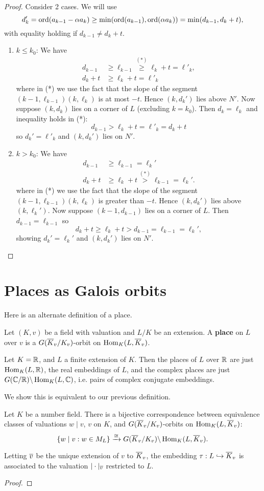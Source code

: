 \begin{proof}
Consider 2 cases. We will use 
\[
d_k'=\operatorname{ord}(a_{k-1}-\alpha a_{k})\ge 
\min(\operatorname{ord}(a_{k-1}),\operatorname{ord}(\alpha a_{k}))=\min(d_{k-1},d_k+t),
\]
with equality holding if $d_{k-1}\ne d_k+t$.
\begin{enumerate}
\item $k\le k_0$: We have
\begin{align*}
d_{k-1}& \ge \ell_{k-1}\stackrel{(*)}{\ge} \ell_k+t=\ell'_k,\\
d_k+t& \ge \ell_k+t= \ell'_k
\end{align*}
where in (*) we use the fact that the slope of the segment $(k-1,\ell_{k-1})(k,\ell_k)$ is at most $-t$. 
Hence $(k,d_k')$ lies above $N'$. Now suppose $(k,d_k)$ lies on a corner of $L$ (excluding $k=k_0$). Then $d_k=\ell_k$ and inequality holds in (*):
\[
d_{k-1}>\ell_k+t=\ell'_k=d_k+t
\]
so $d_k'=\ell'_k$ and $(k,d_k')$ lies on $N'$.
\item $k>k_0$: We have
\begin{align*}
d_{k-1}&\ge\ell_{k-1}=\ell_k'\\
d_{k}+t&\ge \ell_k+t\stackrel{(*)}{>} \ell_{k-1}=\ell_k'.
\end{align*}
where in (*) we use the fact that the slope of the segment $(k-1,\ell_{k-1})(k,\ell_k)$ is greater than $-t$. Hence $(k,d_k')$ lies above $(k,\ell_k')$. Now suppose $(k-1,d_{k-1})$ lies on a corner of $L$. Then $d_{k-1}=\ell_{k-1}$ so
\[
d_{k}+t\ge\ell_k+t>d_{k-1}=\ell_{k-1}=\ell_k',
\]
showing $d_k'=\ell_k'$ and $(k,d_k')$ lies on $N'$.\qedhere
\end{enumerate}
\end{proof}
%
\section{Places as Galois orbits}
Here is an alternate definition of a place.
\begin{df}
Let $(K,v)$ be a field with valuation and $L/K$ be an extension. A \textbf{place} on $L$ over $v$ is a $G(\overline{K}_v/K_v)$-orbit on $\operatorname{Hom}_K(L,\overline{K}_v)$.
\end{df}
\begin{ex}
Let $K=\mathbb{R}$, and $L$ a finite extension of $K$. Then the places of $L$ over $\mathbb{R}$ are just $\operatorname{Hom}_K(L,\mathbb{R})$, the real embeddings of $L$, and the complex places are just $G(\mathbb{C}/\mathbb{R})\backslash\operatorname{Hom}_K(L,\mathbb{C})$, i.e. pairs of complex conjugate embeddings.
\end{ex}
We show this is equivalent to our previous definition.
\begin{thm}
Let $K$ be a number field. 
There is a bijective correspondence between equivalence classes of valuations $w\mid v$, $v$ on $K$, and $G(\overline{K}_v/K_v)$-orbits on $\operatorname{Hom}_K(L,\overline{K}_v)$:
\[
\left\{{w\mid v}:{w\in M_L}\right\}\xrightarrow{\cong} G(\overline{K}_v/K_v)\backslash\operatorname{Hom}_K(L,\overline{K}_v).
\]

Letting $\overline{v}$ be the unique extension of $v$ to $\overline{K}_v$, 
the embedding $\tau:L\hookrightarrow \overline{K}_v$ is associated to the valuation $|\cdot|_{\overline{v}}$ restricted to $L$.
\end{thm}
\begin{proof}
\end{proof}
%
